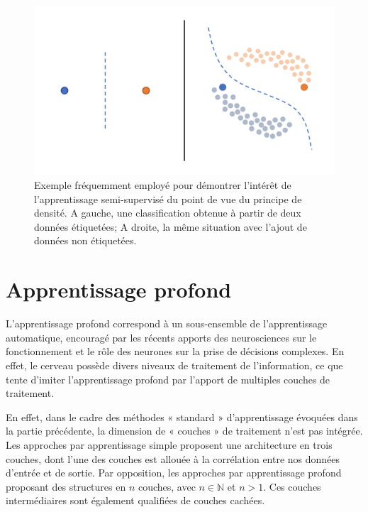 \begin{figure}[H]
    \centering
    \includegraphics[width=\linewidth]{contents/chapter_3/resources/example_semi_supervised.pdf}
    \caption{Exemple fréquemment employé pour démontrer l'intérêt de l'apprentissage semi-supervisé du point de vue du principe de densité. A gauche, une classification obtenue à partir de deux données étiquetées; A droite, la même situation avec l’ajout de données non étiquetées.}
    \label{fig:example_semi_supervised}
\end{figure}

\clearpage

\section{Apprentissage profond}
\label{sec:deep_learning}
L’apprentissage profond correspond à un sous-ensemble de l’apprentissage automatique, encouragé par les récents apports des neurosciences sur le fonctionnement et le rôle des neurones sur la prise de décisions complexes. En effet, le cerveau possède divers niveaux de traitement de l’information, ce que tente d'imiter l'apprentissage profond par l'apport de multiples couches de traitement.\par

En effet, dans le cadre des méthodes « standard » d’apprentissage évoquées dans la partie précédente, la dimension de « couches » de traitement n’est pas intégrée. Les approches par apprentissage simple proposent une architecture en trois couches, dont l’une des couches est allouée à la corrélation entre nos données d’entrée et de sortie. Par opposition, les approches par apprentissage profond proposant des structures en $n$ couches, avec $n \in \pmb{\mathbb{N}}$ et $n>1$. Ces couches intermédiaires sont également qualifiées de couches cachées.\par 

